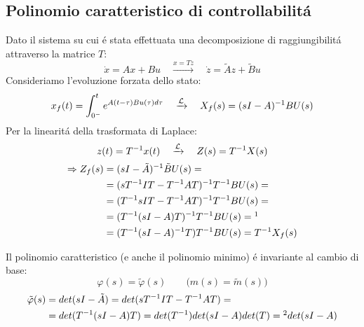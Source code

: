 \documentclass[../main.tex]{subfiles}
\begin{document}
	\subsection{Polinomio caratteristico di controllabilit\'a}
		Dato il sistema su cui \'e stata effettuata una decomposizione di raggiungibilit\'a attraverso la matrice $ T $:
		\[
			\dot x = Ax+Bu \quad\xrightarrow{x=Tz}\quad \dot z = \tilde Az + \tilde Bu
		\]
		Consideriamo l'evoluzione forzata dello stato:
		\[
			x_f(t) = \int_{0^-}^{t}e^{A(t-\tau)Bu(\tau)d\tau} \quad \xrightarrow{\mathcal{L}} \quad X_f(s) = (sI-A)^{-1} B U(s)
		\]
		Per la linearit\'a della trasformata di Laplace:
		\[
			z(t) = T^{-1} x(t) \quad \xrightarrow{\mathcal{L}} \quad Z(s) = T^{-1} X(s)
		\]
		\begin{align*}
			\Rightarrow Z_f(s) &= (sI-\tilde A)^{-1} \tilde B U(s) =
			\\
			&= (s T^{-1} I T - T^{-1} A T )^{-1} T^{-1} B U(s) =
			\\
			&= (T^{-1} sI T - T^{-1} A T )^{-1} T^{-1} B U(s) =
			\\
			&= (T^{-1} (sI-A) T)^{-1} T^{-1} B U(s) =\footnotemark
			\\
			&= (T^{-1} (sI-A)^{-1} T) T^{-1} B U(s) = T^{-1} X_f(s)
		\end{align*}
		
		
		Il polinomio caratteristico (e anche il polinomio minimo) \'e invariante al cambio di base:
		\[
			\varphi(s) = \tilde \varphi(s) \qquad \big(  m(s) = \tilde m(s) \big)
		\]
		\begin{align*}
			\tilde \varphi(s) &= det(sI-\tilde A) = det(s T^{-1} I T - T^{-1} A T) =
			\\
			&= det(T^{-1} (sI-A) T) = det(T^{-1}) det(sI-A) det(T) =\footnotemark det(sI-A) 
		\end{align*}
		
\end{document}
